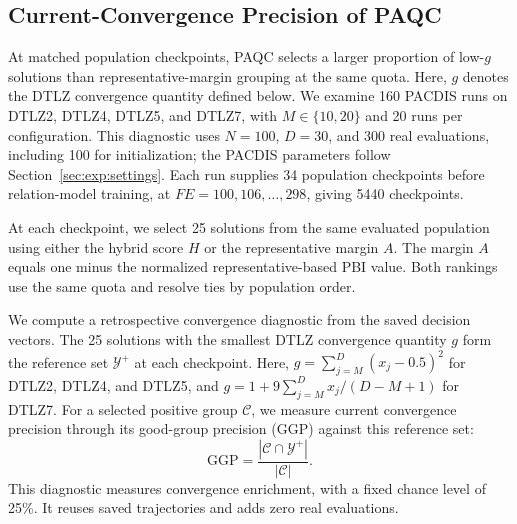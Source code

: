 \documentclass[final,5p,times,twocolumn]{elsarticle}
\begin{document}



\begin{samepage}
\subsection{Current-Convergence Precision of PAQC}
\label{sec:exp:ggp}

At matched population checkpoints, PAQC selects a larger proportion of
low-$g$ solutions than representative-margin grouping at the same quota.
Here, $g$ denotes the DTLZ convergence quantity defined below.
We examine 160 PACDIS runs on DTLZ2, DTLZ4, DTLZ5, and DTLZ7, with
$M\in\{10,20\}$ and 20 runs per configuration. This diagnostic uses
$N=100$, $D=30$, and 300 real evaluations, including 100 for initialization;
the PACDIS parameters follow Section~\ref{sec:exp:settings}.
Each run supplies 34 population checkpoints before relation-model training,
at $FE=100,106,\ldots,298$, giving 5440 checkpoints.\par
\end{samepage}

At each checkpoint, we select 25 solutions from the same evaluated population
using either the hybrid score $H$ or the representative margin $A$.
The margin $A$ equals one minus the normalized representative-based PBI value.
Both rankings use the same quota and resolve ties by population order.



We compute a retrospective convergence diagnostic from the saved decision
vectors. The 25 solutions with the smallest DTLZ convergence quantity $g$
form the reference set $\mathcal{Y}^{+}$ at each checkpoint.
Here, $g=\sum_{j=M}^{D}(x_j-0.5)^2$ for DTLZ2, DTLZ4, and DTLZ5, and
$g=1+9\sum_{j=M}^{D}x_j/(D-M+1)$ for DTLZ7.
For a selected positive group $\mathcal{C}$, we measure current convergence
precision through its good-group precision (GGP) against this reference set:
\begin{equation}
\mathrm{GGP}=\frac{|\mathcal{C}\cap\mathcal{Y}^{+}|}{|\mathcal{C}|}.
\label{eq:ggp}
\end{equation}
This diagnostic measures convergence enrichment,
with a fixed chance level of 25\%. It reuses saved
trajectories and adds zero real evaluations.
\end{document}

